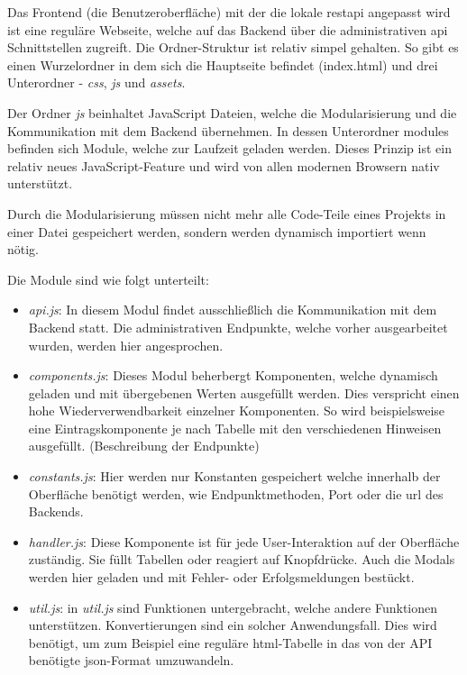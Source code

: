 Das Frontend (die Benutzeroberfläche) mit der die lokale  \gls{restapi} angepasst wird ist eine reguläre Webseite, welche auf das Backend über die administrativen \gls{api} Schnittstellen zugreift. Die Ordner-Struktur ist relativ simpel gehalten. So gibt es einen Wurzelordner in dem sich die Hauptseite befindet (index.html) und drei Unterordner - \textit{css}, \textit{js} und \textit{assets}. 

Der Ordner \textit{js} beinhaltet JavaScript Dateien, welche die Modularisierung und die Kommunikation mit dem Backend übernehmen. In dessen Unterordner modules befinden sich Module, welche zur Laufzeit geladen werden. Dieses Prinzip ist ein relativ neues JavaScript-Feature und wird von allen modernen Browsern nativ unterstützt.

Durch die Modularisierung müssen nicht mehr alle Code-Teile eines Projekts in einer Datei gespeichert werden, 
sondern werden dynamisch importiert wenn nötig. \cite{Mozilla.2020}

Die Module sind wie folgt unterteilt:

\begin{itemize}
    \item \textit{api.js}: In diesem Modul findet ausschließlich die Kommunikation mit dem Backend statt. Die administrativen Endpunkte, welche vorher ausgearbeitet wurden, werden hier angesprochen.
    \item \textit{components.js}: Dieses Modul beherbergt Komponenten, welche dynamisch geladen und mit übergebenen Werten ausgefüllt werden. Dies verspricht einen hohe Wiederverwendbarkeit einzelner Komponenten. So wird beispielsweise eine Eintragskomponente je nach Tabelle mit den verschiedenen Hinweisen ausgefüllt. (Beschreibung der Endpunkte) 
    \item \textit{constants.js}: Hier werden nur Konstanten gespeichert welche innerhalb der Oberfläche benötigt werden, wie Endpunktmethoden, Port oder die \gls{url} des Backends.
    \item \textit{handler.js}: Diese Komponente ist für jede User-Interaktion auf der Oberfläche zuständig. Sie füllt Tabellen oder reagiert auf Knopfdrücke. Auch die Modals werden hier geladen und mit Fehler- oder Erfolgsmeldungen bestückt.
    \item \textit{util.js}: in \textit{util.js} sind Funktionen untergebracht, welche andere Funktionen unterstützen. Konvertierungen sind ein solcher Anwendungsfall. Dies wird benötigt, um zum Beispiel eine reguläre \gls{html}-Tabelle in das von der API benötigte \gls{json}-Format umzuwandeln.
\end{itemize}


